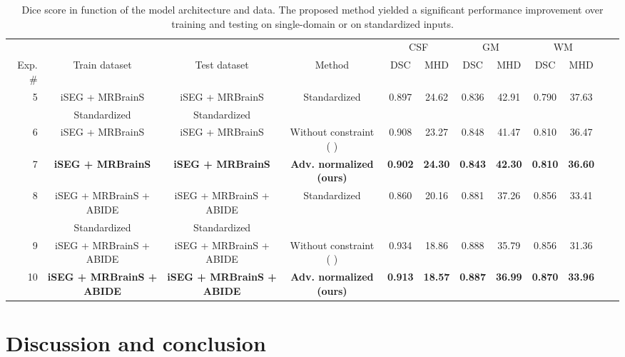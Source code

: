 \documentclass[preprint,12pt]{elsarticle}
\begin{document}
\begin{table}
\begin{adjustwidth}{-7em}{-5em}
  \centering
  \begin{tiny}
  \begin{tabular}{r*{11}{c}}
    \toprule
    & & & & \multicolumn{2}{c}{CSF} & \multicolumn{2}{c}{GM} & \multicolumn{2}{c}{WM} \\
     \cmidrule(lr){5-6} \cmidrule(lr){7-8} \cmidrule(lr){9-10}
    Exp. \# &  Train dataset & Test dataset & Method & DSC & MHD & DSC & MHD & DSC & MHD \\
    \midrule
    5 & iSEG + MRBrainS & iSEG + MRBrainS & Standardized & 0.897 & 24.62 & 0.836 & 42.91 & 0.790 & 37.63\\
    & Standardized & Standardized & & & & \\
    6 & iSEG + MRBrainS & iSEG + MRBrainS & Without constraint ( \cite{Drozdzal}) & 0.908 & 23.27 & 0.848 & 41.47 & 0.810 & 36.47 \\
    7 & \textbf{iSEG + MRBrainS} & \textbf{iSEG + MRBrainS} & {\textbf{Adv. normalized (ours)}} &\textbf{0.902} & \textbf{24.30} & \textbf{0.843} & \textbf{42.30} & \textbf{0.810} & \textbf{36.60} \\
    \midrule
    8 & iSEG + MRBrainS + ABIDE & iSEG + MRBrainS + ABIDE & Standardized & 0.860 & 20.16 & 0.881 & 37.26 & 0.856 & 33.41 \\
    & Standardized & Standardized & & & & \\
    9 & iSEG + MRBrainS + ABIDE & iSEG + MRBrainS + ABIDE &  Without constraint ( \cite{Drozdzal}) & 0.934 & 18.86 & 0.888 & 35.79 & 0.856 & 31.36 \\
    10 & \textbf{iSEG + MRBrainS + ABIDE} & \textbf{iSEG + MRBrainS + ABIDE} &  {\textbf{Adv. normalized (ours)}} &  \textbf{0.913} & \textbf{18.57} & \textbf{0.887} & \textbf{36.99} & \textbf{0.870} & \textbf{33.96} \\
    \bottomrule
  \end{tabular}
  \end{tiny}
  \end{adjustwidth}
  \caption{Dice score in function of the model architecture and data. The proposed method yielded a significant performance improvement over training and testing on single-domain or on standardized inputs.}
\label{table3}
\end{table}

\section{Discussion and conclusion}
\end{document}
